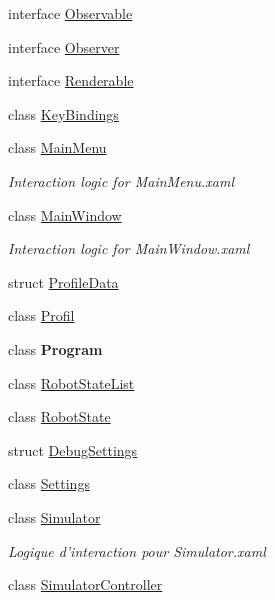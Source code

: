 \begin{DoxyCompactItemize}
interface \hyperlink{interface_interface_graphique_1_1_observable}{Observable}
\item 
interface \hyperlink{interface_interface_graphique_1_1_observer}{Observer}
\item 
interface \hyperlink{interface_interface_graphique_1_1_renderable}{Renderable}
\item 
class \hyperlink{class_interface_graphique_1_1_key_bindings}{Key\-Bindings}
\item 
class \hyperlink{class_interface_graphique_1_1_main_menu}{Main\-Menu}
\begin{DoxyCompactList}\small\item\em Interaction logic for Main\-Menu.\-xaml \end{DoxyCompactList}\item 
class \hyperlink{class_interface_graphique_1_1_main_window}{Main\-Window}
\begin{DoxyCompactList}\small\item\em Interaction logic for Main\-Window.\-xaml \end{DoxyCompactList}\item 
struct \hyperlink{struct_interface_graphique_1_1_profile_data}{Profile\-Data}
\item 
class \hyperlink{class_interface_graphique_1_1_profil}{Profil}
\item 
class {\bfseries Program}
\item 
class \hyperlink{class_interface_graphique_1_1_robot_state_list}{Robot\-State\-List}
\item 
class \hyperlink{class_interface_graphique_1_1_robot_state}{Robot\-State}
\item 
struct \hyperlink{struct_interface_graphique_1_1_debug_settings}{Debug\-Settings}
\item 
class \hyperlink{class_interface_graphique_1_1_settings}{Settings}
\item 
class \hyperlink{class_interface_graphique_1_1_simulator}{Simulator}
\begin{DoxyCompactList}\small\item\em Logique d'interaction pour Simulator.\-xaml \end{DoxyCompactList}\item 
class \hyperlink{class_interface_graphique_1_1_simulator_controller}{Simulator\-Controller}
\end{DoxyCompactItemize}
